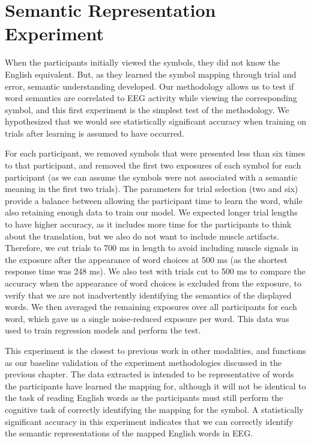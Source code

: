 \section{Semantic Representation Experiment}
\label{sec:experiments:semanticrepresentation}

When the participants initially viewed the symbols, they did not know the 
English equivalent. But, as they learned the symbol mapping through trial and 
error, semantic understanding developed. Our methodology allows us to test if 
word semantics are correlated to EEG activity while viewing the corresponding 
symbol, and this first experiment is the simplest test of the methodology. We 
hypothesized that we would see statistically significant accuracy when training 
on trials after learning is assumed to have occurred.

For each participant, we removed symbols that were presented less than six 
times to that participant, and removed the first two exposures of each symbol 
for each participant (as we can assume the symbols were not associated with a 
semantic meaning in the first two trials). The parameters for trial selection 
(two and six) provide a balance between allowing the participant time to learn 
the word, while also retaining enough data to train our model. We expected 
longer trial lengths to have higher accuracy, as it includes more time for the 
participants to think about the translation, but we also do not want to include 
muscle artifacts. Therefore, we cut trials to 700 ms in length to avoid 
including muscle signals in the exposure after the appearance of word choices 
at 500 ms (as the shortest response time was 248 ms).  We also test with trials 
cut to 500 ms to compare the \tvt accuracy when the appearance of word choices 
is excluded from the exposure, to verify that we are not inadvertently 
identifying the semantics of the displayed words.  We then averaged the 
remaining exposures over all participants for each word, which gave us a single 
noise-reduced exposure per word. This data was used to train regression models 
and perform the \tvt test. 

This experiment is the closest to previous work in other modalities, and 
functions as our baseline validation of the experiment methodologies discussed 
in the previous chapter. The data extracted is intended to be representative of 
words the participants have learned the mapping for, although it will not be 
identical to the task of reading English words as the participants must still 
perform the cognitive task of correctly identifying the mapping for the symbol.  
A statistically significant \tvt accuracy in this experiment indicates that we 
can correctly identify the semantic representations of the mapped English words 
in EEG.
